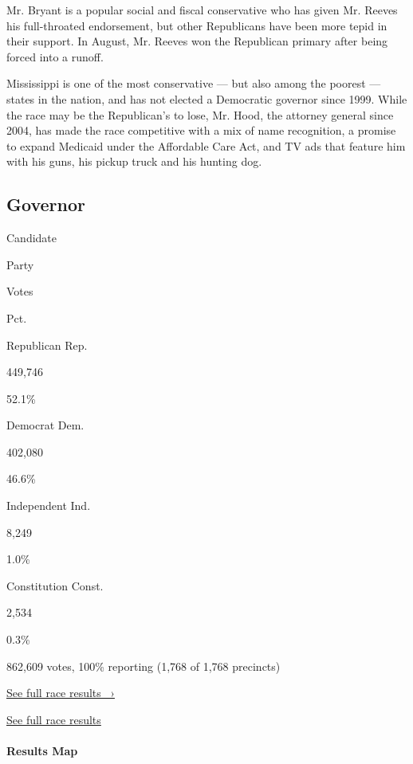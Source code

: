 Mr. Bryant is a popular social and fiscal conservative who has given Mr.
Reeves his full-throated endorsement, but other Republicans have been
more tepid in their support. In August, Mr. Reeves won the Republican
primary after being forced into a runoff.

Mississippi is one of the most conservative --- but also among the
poorest --- states in the nation, and has not elected a Democratic
governor since 1999. While the race may be the Republican's to lose, Mr.
Hood, the attorney general since 2004, has made the race competitive
with a mix of name recognition, a promise to expand Medicaid under the
Affordable Care Act, and TV ads that feature him with his guns, his
pickup truck and his hunting dog.

\hypertarget{governor}{%
\subsection{Governor}\label{governor}}

Candidate

Party

Votes

Pct.

Republican Rep.

449,746

52.1\%

Democrat Dem.

402,080

46.6\%

Independent Ind.

8,249

1.0\%

Constitution Const.

2,534

0.3\%

862,609 votes, 100\% reporting (1,768 of 1,768 precincts)

\href{https://www.nytimes3xbfgragh.onion/interactive/2019/11/05/us/elections/results-mississippi-governor-general-election.html}{See
full race results ~›}

\href{https://www.nytimes3xbfgragh.onion/interactive/2019/11/05/us/elections/results-mississippi-governor-general-election.html}{See
full race results }

\hypertarget{results-map}{%
\paragraph{Results Map}\label{results-map}}

